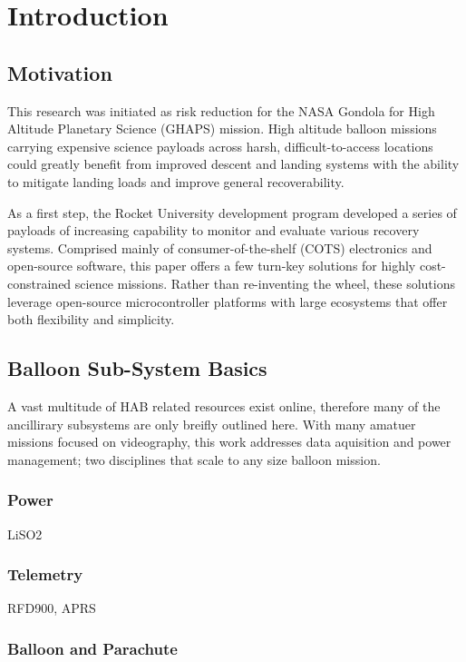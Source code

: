 \documentclass[heading.tex]{subfiles}
\begin{document}

\section{Introduction}
\subsection{Motivation}
This research was initiated as risk reduction for the NASA
Gondola for High Altitude Planetary Science (GHAPS) mission.
High altitude balloon missions carrying expensive science payloads
across harsh, difficult-to-access locations could greatly benefit from
improved descent and landing systems with the ability to mitigate landing
loads and improve general recoverability.

As a first step, the Rocket University development program developed a series
of payloads of increasing capability to monitor and evaluate various recovery
systems. Comprised mainly of consumer-of-the-shelf (COTS) electronics and
open-source software, this paper offers a few turn-key solutions for highly
cost-constrained science missions. Rather than re-inventing the wheel, these
solutions leverage open-source microcontroller platforms with large ecosystems
that offer both flexibility and simplicity.


\subsection{Balloon Sub-System Basics}

A vast multitude of HAB related resources exist online, therefore many of the
ancillirary subsystems are only breifly outlined here. With many amatuer missions
focused on videography, this work addresses data aquisition and power management;
two disciplines that scale to any size balloon mission.

\subsubsection{Power}

LiSO2

\subsubsection{Telemetry}

RFD900, APRS

\subsubsection{Balloon and Parachute}
\end{document}
